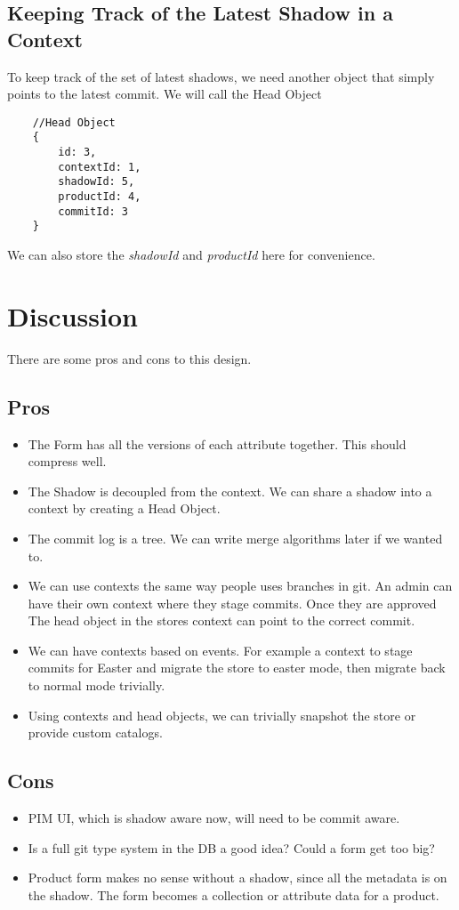 \documentclass[11pt]{article}
\begin{document}
\subsection{Keeping Track of the Latest Shadow in a Context}

To keep track of the set of latest shadows, we need another object that simply
points to the latest commit. We will call the Head Object

\begin{lstlisting}
    //Head Object
    {
        id: 3,
        contextId: 1,
        shadowId: 5,
        productId: 4,
        commitId: 3
    }
\end{lstlisting}

We can also store the \emph{shadowId} and \emph{productId} here for convenience.

\section{Discussion}

There are some pros and cons to this design. 

\subsection{Pros}

\begin{itemize}
    \item The Form has all the versions of each attribute together. This should
        compress well.
    \item The Shadow is decoupled from the context. We can share a shadow into
        a context by creating a Head Object.
    \item The commit log is a tree. We can write merge algorithms later if we wanted
        to.
    \item We can use contexts the same way people uses branches in git. An admin
        can have their own context where they stage commits. Once they are approved
        The head object in the stores context can point to the correct commit.
    \item We can have contexts based on events. For example a context to stage
        commits for Easter and migrate the store to easter mode, then migrate
        back to normal mode trivially.
    \item Using contexts and head objects, we can trivially snapshot the store
        or provide custom catalogs. 
\end{itemize}

\subsection{Cons}
\begin{itemize}
    \item PIM UI, which is shadow aware now, will need to be commit aware.
    \item Is a full git type system in the DB a good idea? Could a form get too big?
    \item Product form makes no sense without a shadow, since all the metadata is
        on the shadow. The form becomes a collection or attribute data for a product.
\end{itemize}
\end{document}
